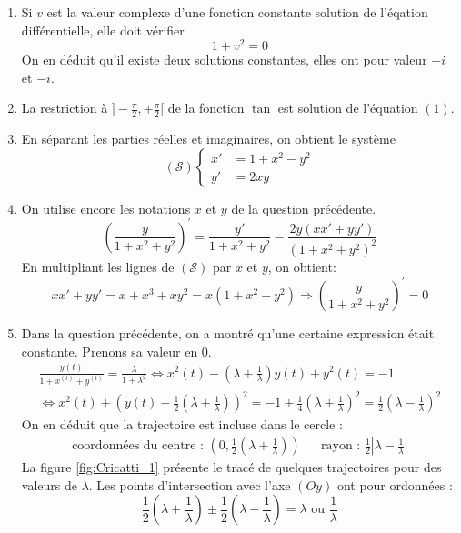 \begin{enumerate}
 \item Si $v$ est la valeur complexe d'une fonction constante solution de l'éqation différentielle, elle doit vérifier
\begin{displaymath}
 1+v^2 = 0
\end{displaymath}
 On en déduit qu'il existe deux solutions constantes, elles ont pour valeur $+i$ et $-i$.
\item La restriction à $]-\frac{\pi}{2},+\frac{\pi}{2}[$ de la fonction $\tan$ est solution de l'équation $(1)$.
\item En séparant les parties réelles et imaginaires, on obtient le système 
\begin{displaymath}
 (\mathcal S)
\left\lbrace
\begin{aligned}
 x' &= 1+x^2-y^2 \\
 y' &= 2xy
\end{aligned}
 \right. 
\end{displaymath}
\item On utilise encore les notations $x$ et $y$ de la question précédente.
\begin{displaymath}
 \left(\frac{y}{1+x^2+y^2}\right)^\prime
=\frac{y'}{1+x^2+y^2} - \frac{2y(xx'+yy')}{(1+x^2+y^2)^2}
\end{displaymath}
En multipliant les lignes de $(\mathcal S)$ par $x$ et $y$, on obtient:
\begin{displaymath}
 xx'+yy' =x+x^3+xy^2=x(1+x^2+y^2)
\Rightarrow
\left(\frac{y}{1+x^2+y^2}\right)^\prime = 0
\end{displaymath}

\item Dans la question précédente, on a montré qu'une certaine expression était constante. Prenons sa valeur en $0$.
\begin{multline*}
 \frac{y(t)}{1+x^(t)+y^(t)}=\frac{\lambda}{1+\lambda^2}
\Leftrightarrow x^2(t)-\left(\lambda + \frac{1}{\lambda} \right)y(t)+y^2(t)=-1\\
\Leftrightarrow x^2(t)+\left(y(t)-\frac{1}{2}(\lambda + \frac{1}{\lambda}) \right)^2= -1 + \frac{1}{4}(\lambda + \frac{1}{\lambda})^2 = \frac{1}{2}(\lambda - \frac{1}{\lambda})^2
\end{multline*}
On en déduit que la trajectoire est incluse dans le cercle :
\begin{align*}
 \text{coordonnées du centre : } \left( 0,\frac{1}{2}(\lambda + \frac{1}{\lambda}) \right) & &
\text{rayon : } \frac{1}{2} \left\vert \lambda - \frac{1}{\lambda}\right\vert
\end{align*}
La figure \ref{fig:Cricatti_1} présente le tracé de quelques trajectoires pour des valeurs de $\lambda$. Les points d'intersection avec l'axe $(Oy)$ ont pour ordonnées :
\begin{displaymath}
 \frac{1}{2}\left( \lambda + \frac{1}{\lambda}\right)  \pm \frac{1}{2} \left( \lambda - \frac{1}{\lambda}\right)
= \lambda \text{ ou } \frac{1}{\lambda}
\end{displaymath}
\end{enumerate}

